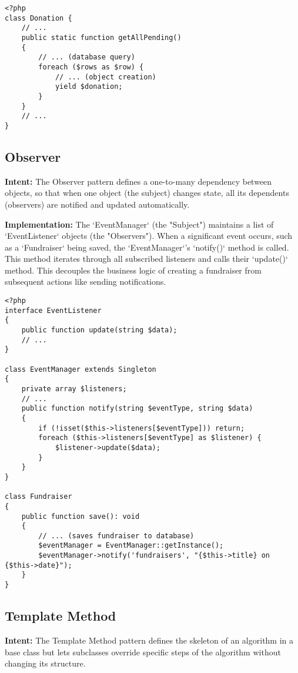 \documentclass[11pt,a4paper]{article}
\begin{document}
\begin{lstlisting}[caption={Using a generator (Iterator) for efficient data fetching.}, label={lst:iterator-yield}]
% Filepath: src\models\payments.php
<?php
class Donation {
    // ...
	public static function getAllPending()
	{
		// ... (database query)
		foreach ($rows as $row) {
			// ... (object creation)
			yield $donation;
		}
	}
    // ...
}
\end{lstlisting}

\subsection{Observer}
\textbf{Intent:} The Observer pattern defines a one-to-many dependency between objects, so that when one object (the subject) changes state, all its dependents (observers) are notified and updated automatically.

\textbf{Implementation:} The `EventManager` (the "Subject") maintains a list of `EventListener` objects (the "Observers"). When a significant event occurs, such as a `Fundraiser` being saved, the `EventManager`'s `notify()` method is called. This method iterates through all subscribed listeners and calls their `update()` method. This decouples the business logic of creating a fundraiser from subsequent actions like sending notifications.

\begin{lstlisting}[caption={The Observer pattern implementation.}, label={lst:observer}]
% Filepath: src\models\events.php
<?php
interface EventListener
{
	public function update(string $data);
	// ...
}

class EventManager extends Singleton
{
	private array $listeners;
	// ...
	public function notify(string $eventType, string $data)
	{
		if (!isset($this->listeners[$eventType])) return;
		foreach ($this->listeners[$eventType] as $listener) {
			$listener->update($data);
		}
	}
}

class Fundraiser
{
	public function save(): void
	{
		// ... (saves fundraiser to database)
		$eventManager = EventManager::getInstance();
		$eventManager->notify('fundraisers', "{$this->title} on {$this->date}");
	}
}
\end{lstlisting}

\subsection{Template Method}
\textbf{Intent:} The Template Method pattern defines the skeleton of an algorithm in a base class but lets subclasses override specific steps of the algorithm without changing its structure.
\end{document}
